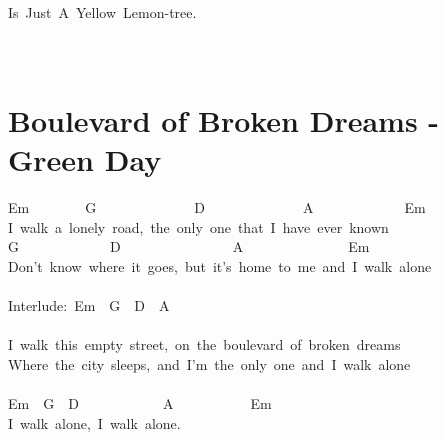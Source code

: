 \documentclass[]{book}
\let\stdsection\section
\renewcommand\section{\clearpage\stdsection}
\begin{document}
Is~Just~A~Yellow~Lemon-tree.\\
~\\
~\\

\hypertarget{boulevard-of-broken-dreams---green-day}{%
\section{Boulevard of Broken Dreams - Green Day}\label{boulevard-of-broken-dreams---green-day}}

Em~~~~~~~~G~~~~~~~~~~~~~~D~~~~~~~~~~~~~~A~~~~~~~~~~~~~Em\\
I~walk~a~lonely~road,~the~only~one~that~I~have~ever~known\\
\hspace*{0.333em}\hspace*{0.333em}\hspace*{0.333em}\hspace*{0.333em}\hspace*{0.333em}\hspace*{0.333em}\hspace*{0.333em}\hspace*{0.333em}\hspace*{0.333em}\hspace*{0.333em}\hspace*{0.333em}\hspace*{0.333em}G~~~~~~~~~~~~~D~~~~~~~~~~~~~~~~A~~~~~~~~~~~~~~~Em\\
Don't~know~where~it~goes,~but~it's~home~to~me~and~I~walk~alone\\
~\\
Interlude:~Em~~G~~D~~A\\
~\\
I~walk~this~empty~street,~on~the~boulevard~of~broken~dreams\\
Where~the~city~sleeps,~and~I'm~the~only~one~and~I~walk~alone\\
~\\
Em~~G~~D~~~~~~~~~~~~A~~~~~~~~~~~Em\\
\hspace*{0.333em}\hspace*{0.333em}\hspace*{0.333em}\hspace*{0.333em}\hspace*{0.333em}\hspace*{0.333em}\hspace*{0.333em}\hspace*{0.333em}\hspace*{0.333em}\hspace*{0.333em}\hspace*{0.333em}\hspace*{0.333em}I~walk~alone,~I~walk~alone.\\
\end{document}
